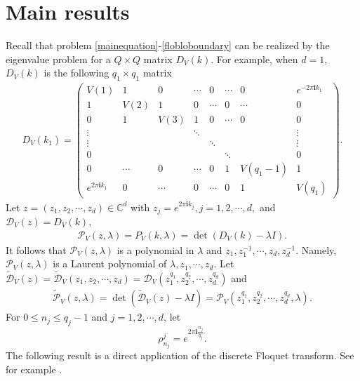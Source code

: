 \documentclass[12pt,letterpaper]{amsart}
\begin{document}
\section{Main results}
\setcounter{equation}{0}
Recall that problem \eqref{mainequation}-\eqref{flobloboundary} can be realized by the eigenvalue problem for a $Q\times Q$ matrix $D_V(k)$.
For example, when $d=1$, $D_V(k)$ is the following $q_1\times q_1$ matrix
\begin{align}
D_V(k_1)=\begin{pmatrix}
V(1)& 1& 0&\cdots&0&\cdots& 0& e^{-2\pi \mathbf{i}k_1}\\
1& V(2)& 1& 0&\cdots& 0&\cdots&0\\
0&1& V(3)& 1& 0&\cdots&0&0\\
\vdots&&&\ddots&&&&\vdots\\
\vdots&&&&\ddots&&&\vdots\\
0&&&&&\ddots&&0\\
0&\cdots&0&\cdots&0&1&V(q_1-1)&1\\
e^{2\pi \mathbf{i}k_1}&0&\cdots&0&\cdots&0&1&V(q_1)
\end{pmatrix}.\nonumber
\end{align}
Let $z=(z_1,z_2,\cdots,z_d)\in \mathbb{C}^d$ with $z_j=e^{2\pi \mathbf{i}k_j},j=1,2,\cdots,d,$ and $\mathcal{D}_V(z)=D_V(k)$,
\begin{align}
\mathcal{P}_V(z,\lambda)=P_V(k,\lambda)=\det(D_V(k)-\lambda I).\label{pvzpvkfer}
\end{align}
It follows that $\mathcal{P}_V(z,\lambda)$ is a polynomial in $\lambda$ and $z_1,z_1^{-1},\cdots,z_d,z_d^{-1}$.
Namely, $\mathcal{P}_V(z,\lambda)$ is a Laurent polynomial of $\lambda,z_1,\cdots,z_d$.
Let $\tilde{\mathcal{D}}_V(z)=\tilde{\mathcal{D}}_V(z_1,z_2,\cdots,z_d)=\mathcal{D}_V(z_1^{q_1},z_2^{q_2},\cdots,z_d^{q_d})$
and
\begin{align}
\tilde{\mathcal{P}}_V(z,\lambda)=\det(\tilde{\mathcal{D}}_V(z)-\lambda I)=\mathcal{P}_V(z_1^{q_1},z_2^{q_2},\cdots,z_d^{q_d},\lambda).\label{pvztilde}
\end{align}
For $0\leq n_j\leq q_j-1$ and $j=1,2,\cdots,d$, let
\[\rho^j_{n_j}=e^{2\pi \mathbf{i}\frac{n_j}{q_j}}.\]
The following result is a direct application of the discrete Floquet transform. See for example \cite{flm-2,ku}.
\end{document}
